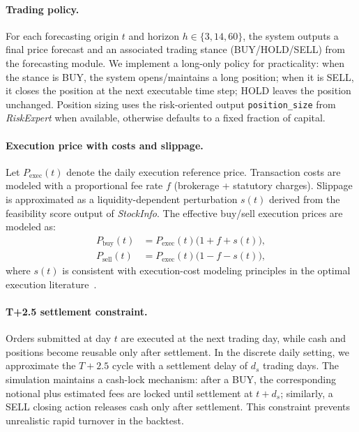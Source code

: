 \documentclass{ieeeaccess}
\begin{document}
\paragraph{Trading policy.}
For each forecasting origin $t$ and horizon $h \in \{3,14,60\}$, the system outputs a final price forecast and an associated trading stance (BUY/HOLD/SELL) from the forecasting module. We implement a long-only policy for practicality: when the stance is BUY, the system opens/maintains a long position; when it is SELL, it closes the position at the next executable time step; HOLD leaves the position unchanged. Position sizing uses the risk-oriented output \texttt{position\_size} from \textit{RiskExpert} when available, otherwise defaults to a fixed fraction of capital.

\paragraph{Execution price with costs and slippage.}
Let $P_{\text{exec}}(t)$ denote the daily execution reference price. Transaction costs are modeled with a proportional fee rate $f$ (brokerage + statutory charges). Slippage is approximated as a liquidity-dependent perturbation $s(t)$ derived from the feasibility score output of \textit{StockInfo}. The effective buy/sell execution prices are modeled as:
\begin{align}
P_{\text{buy}}(t) &= P_{\text{exec}}(t)\big(1+f+s(t)\big),\\
P_{\text{sell}}(t) &= P_{\text{exec}}(t)\big(1-f-s(t)\big),
\end{align}
where $s(t)$ is consistent with execution-cost modeling principles in the optimal execution literature~\cite{almgren2001optimal}.

\paragraph{T+2.5 settlement constraint.}
Orders submitted at day $t$ are executed at the next trading day, while cash and positions become reusable only after settlement. In the discrete daily setting, we approximate the $T+2.5$ cycle with a settlement delay of $d_s$ trading days. The simulation maintains a cash-lock mechanism: after a BUY, the corresponding notional plus estimated fees are locked until settlement at $t+d_s$; similarly, a SELL closing action releases cash only after settlement. This constraint prevents unrealistic rapid turnover in the backtest.
\end{document}
